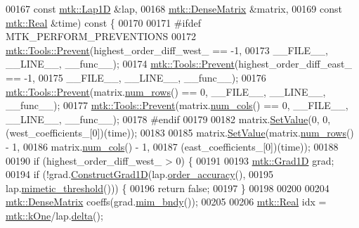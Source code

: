 \begin{DoxyCode}
00167     \textcolor{keyword}{const} \hyperlink{classmtk_1_1Lap1D}{mtk::Lap1D} &lap,
00168     \hyperlink{classmtk_1_1DenseMatrix}{mtk::DenseMatrix} &matrix,
00169     \textcolor{keyword}{const} \hyperlink{group__c01-roots_gac080bbbf5cbb5502c9f00405f894857d}{mtk::Real} &time)\textcolor{keyword}{ const }\{
00170 
00171 \textcolor{preprocessor}{  #ifdef MTK\_PERFORM\_PREVENTIONS}
00172   \hyperlink{classmtk_1_1Tools_a332324c6f25e66be9dff48c5987a3b9f}{mtk::Tools::Prevent}(highest\_order\_diff\_west\_ == -1,
00173                       \_\_FILE\_\_, \_\_LINE\_\_, \_\_func\_\_);
00174   \hyperlink{classmtk_1_1Tools_a332324c6f25e66be9dff48c5987a3b9f}{mtk::Tools::Prevent}(highest\_order\_diff\_east\_ == -1,
00175                       \_\_FILE\_\_, \_\_LINE\_\_, \_\_func\_\_);
00176   \hyperlink{classmtk_1_1Tools_a332324c6f25e66be9dff48c5987a3b9f}{mtk::Tools::Prevent}(matrix.\hyperlink{classmtk_1_1DenseMatrix_a53f3afb3b6a8d21854458aaa9663cc74}{num\_rows}() == 0, \_\_FILE\_\_, \_\_LINE\_\_, \_\_func\_\_);
00177   \hyperlink{classmtk_1_1Tools_a332324c6f25e66be9dff48c5987a3b9f}{mtk::Tools::Prevent}(matrix.\hyperlink{classmtk_1_1DenseMatrix_a41747502d468c6728a4be31501b16e0e}{num\_cols}() == 0, \_\_FILE\_\_, \_\_LINE\_\_, \_\_func\_\_);
00178 \textcolor{preprocessor}{  #endif}
00179 
00182   matrix.\hyperlink{classmtk_1_1DenseMatrix_a784ce5784109ac86bfb9d8562b334b13}{SetValue}(0, 0, (west\_coefficients\_[0])(time));
00183 
00185   matrix.\hyperlink{classmtk_1_1DenseMatrix_a784ce5784109ac86bfb9d8562b334b13}{SetValue}(matrix.\hyperlink{classmtk_1_1DenseMatrix_a53f3afb3b6a8d21854458aaa9663cc74}{num\_rows}() - 1,
00186                   matrix.\hyperlink{classmtk_1_1DenseMatrix_a41747502d468c6728a4be31501b16e0e}{num\_cols}() - 1,
00187                   (east\_coefficients\_[0])(time));
00188 
00190   \textcolor{keywordflow}{if} (highest\_order\_diff\_west\_ > 0) \{
00191 
00193     \hyperlink{classmtk_1_1Grad1D}{mtk::Grad1D} grad;
00194     \textcolor{keywordflow}{if} (!grad.\hyperlink{classmtk_1_1Grad1D_a74ef5245cfae6fd158bd7f563a0c2e52}{ConstructGrad1D}(lap.\hyperlink{classmtk_1_1Lap1D_ae3490534a9e950df3f81b3840c31b13a}{order\_accuracy}(),
00195                               lap.\hyperlink{classmtk_1_1Lap1D_a957ae4ff6053d605ac7b93650ad6f188}{mimetic\_threshold}())) \{
00196       \textcolor{keywordflow}{return} \textcolor{keyword}{false};
00197     \}
00198 
00200 
00204     \hyperlink{classmtk_1_1DenseMatrix}{mtk::DenseMatrix} coeffs(grad.\hyperlink{classmtk_1_1Grad1D_ab25e1d064a5a00fbe3777e65fd5750c0}{mim\_bndy}());
00205 
00206     \hyperlink{group__c01-roots_gac080bbbf5cbb5502c9f00405f894857d}{mtk::Real} idx = \hyperlink{group__c01-roots_ga26407c24d43b6b95480943340d285c71}{mtk::kOne}/lap.\hyperlink{classmtk_1_1Lap1D_a4e16e80c6dd845ac42bda23385a1c56e}{delta}();

\end{DoxyCode}

